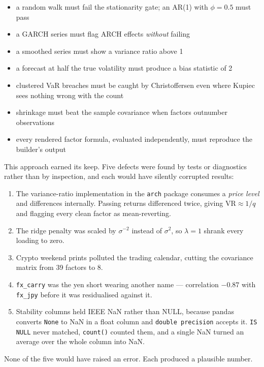 \documentclass[11pt,a4paper]{article}
\newcommand{\code}[1]{\texttt{\small #1}}
\begin{document}
\begin{itemize}[leftmargin=1.4em,itemsep=0.3ex]
\item a random walk must fail the stationarity gate; an AR(1) with $\phi=0.5$ must pass
\item a GARCH series must flag ARCH effects \emph{without} failing
\item a smoothed series must show a variance ratio above 1
\item a forecast at half the true volatility must produce a bias statistic of 2
\item clustered VaR breaches must be caught by Christoffersen even where Kupiec sees
  nothing wrong with the count
\item shrinkage must beat the sample covariance when factors outnumber observations
\item every rendered factor formula, evaluated independently, must reproduce the
  builder's output
\end{itemize}

This approach earned its keep. Five defects were found by tests or diagnostics rather
than by inspection, and each would have silently corrupted results:

\begin{enumerate}[leftmargin=1.6em,itemsep=0.35ex]
\item The variance-ratio implementation in the \code{arch} package consumes a
  \emph{price level} and differences internally. Passing returns differenced twice,
  giving $\mathrm{VR}\approx 1/q$ and flagging every clean factor as mean-reverting.
\item The ridge penalty was scaled by $\sigma^{-2}$ instead of $\sigma^{2}$, so
  $\lambda = 1$ shrank every loading to zero.
\item Crypto weekend prints polluted the trading calendar, cutting the covariance
  matrix from 39 factors to 8.
\item \code{fx\_carry} was the yen short wearing another name --- correlation $-0.87$
  with \code{fx\_jpy} before it was residualised against it.
\item Stability columns held IEEE NaN rather than NULL, because pandas converts
  \code{None} to NaN in a float column and \code{double precision} accepts it.
  \code{IS NULL} never matched, \code{count()} counted them, and a single NaN turned
  an average over the whole column into NaN.
\end{enumerate}

None of the five would have raised an error. Each produced a plausible number.
\end{document}
